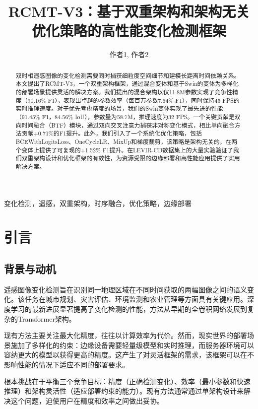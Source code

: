 \documentclass[journal]{IEEEtran}
\begin{document}
\title{RCMT-V3：基于双重架构和架构无关优化策略的高性能变化检测框架}

\author{作者1, 作者2}

\maketitle

\begin{abstract}
双时相遥感图像的变化检测需要同时捕获细粒度空间细节和建模长距离时间依赖关系。本文提出了RCMT-V3，一个双重架构框架，通过混合变体和基于Swin的变体为多样化的部署场景提供灵活的解决方案。我们提出的混合架构以仅11.8M参数实现了竞争性精度（90.16\% F1），表现出卓越的参数效率（每百万参数7.64\% F1），同时保持45 FPS的实时推理速度。对于优先考虑精度的场景，我们的Swin变体实现了最先进的性能（91.45\% F1，84.56\% IoU），参数量为58.7M，推理速度为32 FPS。一个关键贡献是双向时间融合（BTF）模块，通过双向交叉注意力捕获非对称变化模式，相比单向融合方法贡献+0.71\%的F1提升。此外，我们引入了一个系统化优化策略，包括BCEWithLogitsLoss、OneCycleLR、MixUp和梯度裁剪，该策略是架构无关的，在两个变体上提供了可复现的+1.52\% F1提升。在LEVIR-CD数据集上的大量实验验证了我们双重架构设计和优化框架的有效性，为资源受限的边缘部署和高性能应用提供了实用解决方案。
\end{abstract}

\begin{IEEEkeywords}
变化检测，遥感，双重架构，时序融合，优化策略，边缘部署
\end{IEEEkeywords}

\section{引言}

\subsection{背景与动机}

遥感图像变化检测旨在识别同一地理区域在不同时间获取的两幅图像之间的语义变化。该任务在城市规划、灾害评估、环境监测和农业管理等方面具有关键应用。深度学习的最新进展显著提高了变化检测的性能，方法从早期的全卷积网络发展到复杂的Transformer架构。

现有方法主要关注最大化精度，往往以计算效率为代价。然而，现实世界的部署场景施加了多样化的约束：边缘设备需要轻量级模型和实时推理，而服务器环境可以容纳更大的模型以获得更高的精度。这产生了对灵活框架的需求，该框架可以在不影响性能的情况下适应不同的部署要求。

根本挑战在于平衡三个竞争目标：精度（正确检测变化）、效率（最小参数和快速推理）和架构灵活性（适应部署约束的能力）。现有方法通常通过单架构设计来解决这个问题，迫使用户在精度和效率之间做出妥协。
\end{document}
